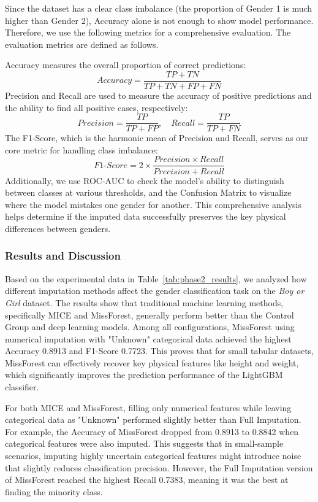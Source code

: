 \documentclass[twocolumn, 9pt]{extarticle}
\begin{document}
Since the dataset has a clear class imbalance (the proportion of Gender 1 is much higher than Gender 2), Accuracy alone is not enough to show model performance. Therefore, we use the following metrics for a comprehensive evaluation. The evaluation metrics are defined as follows.

Accuracy measures the overall proportion of correct predictions:
\begin{equation}
Accuracy = \frac{TP + TN}{TP + TN + FP + FN}
\end{equation}
Precision and Recall are used to measure the accuracy of positive predictions and the ability to find all positive cases, respectively:
\begin{equation}
Precision = \frac{TP}{TP + FP}, \quad Recall = \frac{TP}{TP + FN}
\end{equation}
The F1-Score, which is the harmonic mean of Precision and Recall, serves as our core metric for handling class imbalance:
\begin{equation}
F1\text{-}Score = 2 \times \frac{Precision \times Recall}{Precision + Recall}
\end{equation}
Additionally, we use ROC-AUC to check the model's ability to distinguish between classes at various thresholds, and the Confusion Matrix to visualize where the model mistakes one gender for another. This comprehensive analysis helps determine if the imputed data successfully preserves the key physical differences between genders.

\subsubsection{Results and Discussion}

Based on the experimental data in Table~\ref{tab:phase2_results}, we analyzed how different imputation methods affect the gender classification task on the \textit{Boy or Girl} dataset. The results show that traditional machine learning methods, specifically MICE and MissForest, generally perform better than the Control Group and deep learning models. Among all configurations, MissForest using numerical imputation with "Unknown" categorical data achieved the highest Accuracy 0.8913 and F1-Score 0.7723. This proves that for small tabular datasets, MissForest can effectively recover key physical features like height and weight, which significantly improves the prediction performance of the LightGBM classifier.

For both MICE and MissForest, filling only numerical features while leaving categorical data as "Unknown" performed slightly better than Full Imputation. For example, the Accuracy of MissForest dropped from 0.8913 to 0.8842 when categorical features were also imputed. This suggests that in small-sample scenarios, imputing highly uncertain categorical features might introduce noise that slightly reduces classification precision. However, the Full Imputation version of MissForest reached the highest Recall 0.7383, meaning it was the best at finding the minority class.
\end{document}
